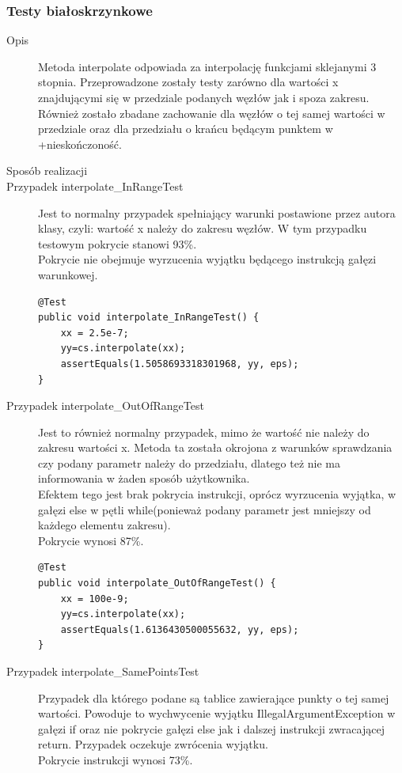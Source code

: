 \documentclass[12pt,a4paper,notitlepage]{article}
\begin{document}
\subsubsection{Testy białoskrzynkowe}
\begin{description}
\item [Opis] Metoda interpolate odpowiada za interpolację funkcjami sklejanymi 3 stopnia. Przeprowadzone zostały testy zarówno dla wartości x znajdującymi się w przedziale podanych węzłów jak i spoza zakresu. Również zostało zbadane zachowanie dla węzłów o tej samej wartości w przedziale oraz dla przedziału o krańcu będącym punktem w +nieskończoność.

\item [Sposób realizacji]

\item[ Przypadek interpolate\_InRangeTest] Jest to normalny przypadek spełniający warunki postawione przez autora klasy, czyli: wartość x należy do zakresu węzłów. W tym przypadku testowym pokrycie stanowi 93\%.\\
Pokrycie nie obejmuje wyrzucenia wyjątku będącego instrukcją gałęzi warunkowej.

\begin{lstlisting}
@Test
public void interpolate_InRangeTest() {
    xx = 2.5e-7;
    yy=cs.interpolate(xx);
    assertEquals(1.5058693318301968, yy, eps);
}
\end{lstlisting}

\item [Przypadek interpolate\_OutOfRangeTest] Jest to również normalny przypadek, mimo że wartość nie należy do zakresu wartości x. Metoda ta została okrojona z warunków sprawdzania czy podany parametr należy do przedziału, dlatego też nie ma informowania w żaden sposób użytkownika.\\
Efektem tego jest brak pokrycia instrukcji, oprócz wyrzucenia wyjątka, w gałęzi else w pętli while(ponieważ podany parametr jest mniejszy od każdego elementu zakresu).\\
Pokrycie wynosi 87\%.

\begin{lstlisting}
@Test
public void interpolate_OutOfRangeTest() {
    xx = 100e-9;
    yy=cs.interpolate(xx);
    assertEquals(1.6136430500055632, yy, eps);
}
\end{lstlisting}

\item [Przypadek interpolate\_SamePointsTest] Przypadek dla którego podane są tablice zawierające punkty o tej samej wartości. Powoduje to wychwycenie wyjątku IllegalArgumentException w gałęzi if oraz nie pokrycie gałęzi else jak i dalszej instrukcji zwracającej return. Przypadek oczekuje zwrócenia wyjątku.\\
Pokrycie instrukcji wynosi 73\%. 


\end{description}
\end{document}
